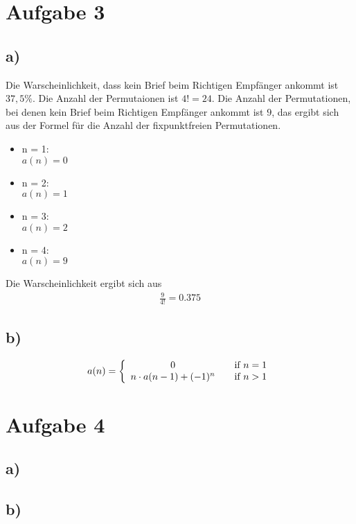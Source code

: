 \documentclass[a4paper]{scrartcl}
\begin{document}
\section*{Aufgabe 3}
\subsection*{a)}
Die Warscheinlichkeit, dass kein Brief beim Richtigen Empfänger ankommt ist $37,5\%$.
Die Anzahl der Permutaionen ist $4! = 24$.
Die Anzahl der Permutationen, bei denen kein Brief beim Richtigen Empfänger ankommt ist $9$, das ergibt sich aus der Formel 
für die Anzahl der fixpunktfreien Permutationen. 
\begin{itemize}
    \item n = 1: \\ 
    $ a(n) = 0 $
    \item n = 2: \\
    $ a(n) = 1 $
    \item n = 3: \\
    $ a(n) = 2 $
    \item n = 4: \\
    $ a(n) = 9 $
\end{itemize}
Die Warscheinlichkeit ergibt sich aus
\begin{align*}
    \frac{9}{4!} = 0.375
\end{align*}

\subsection*{b)}
\begin{align*}
    a(n) = \left\{ 
        \begin{array}{ c l }
            0 & \quad \textrm{if } n = 1 \\
            n \cdot a(n-1) + (-1)^n & \quad \textrm{if } n > 1 \\
        \end{array}
    \right.
\end{align*}

\section*{Aufgabe 4}
\subsection*{a)}

\subsection*{b)}
\end{document}
